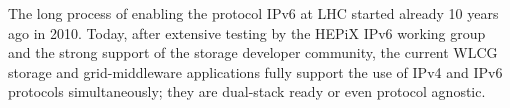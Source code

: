 

The long process of enabling the protocol IPv6 at LHC started already 10 years ago in 2010. Today, after extensive testing by the HEPiX IPv6 working group \cite{ipv6chep2015} and the strong support of the storage developer community, the current WLCG storage and grid-middleware applications fully support the use of IPv4 and IPv6 protocols simultaneously; they are dual-stack ready or even protocol agnostic.






%
%
%

